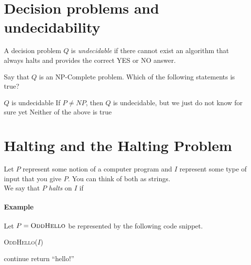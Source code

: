 \documentclass[11  pt]{article}
\begin{document}

    \section{Decision problems and undecidability}
    A decision problem $Q$ is \emph{undecidable} if there cannot exist an algorithm that always halts and provides the correct YES or NO answer.

    \begin{Qu}
        Say that $Q$ is an NP-Complete problem. Which of the following statements is true?
        \begin{itemize}
            \aitem $Q$ is undecidable
            \bitem If $P \neq NP$, then $Q$ is undecidable, but we just do not know for sure yet
            \citem Neither of the above is true
        \end{itemize}
    \end{Qu}


\newpage

\section{Halting and the Halting Problem}
Let $P$ represent some notion of a computer program and $I$ represent some type of input that you give $P$. You can think of both as strings.\\

We say that $P$ \emph{halts} on $I$ if  \\

\paragraph{Example}
Let $P = \textsc{OddHello}$ be represented by the following code snippet.
\begin{algorithm}[h]
    \textsc{OddHello}($I$)
    \begin{algorithmic}
        \State continue
        \EndWhile
        \Else
        \State return ``hello!''
        \EndIf
    \end{algorithmic}
\end{algorithm}
\end{document}
